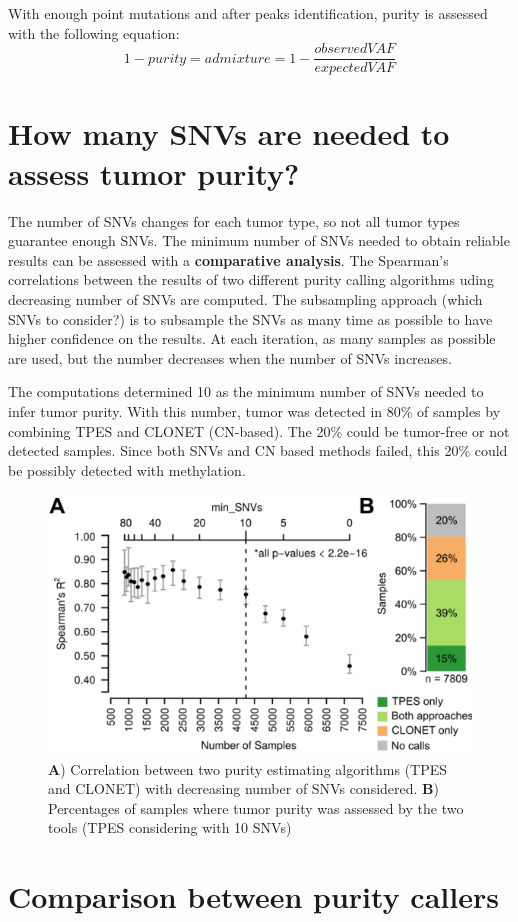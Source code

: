 With enough point mutations and after peaks identification, purity is assessed
with the following equation:
\[ 1-purity = admixture = 1-\frac{observedVAF}{expectedVAF} \]

\section{How many SNVs are needed to assess tumor purity?}

The number of SNVs changes for each tumor type, so not all tumor types guarantee
enough SNVs. The minimum number of SNVs needed to obtain reliable results can be
assessed with a \textbf{comparative analysis}. The Spearman's correlations
between the results of two different purity calling algorithms uding decreasing
number of SNVs are computed. The subsampling approach (which SNVs to consider?)
is to subsample the SNVs as many time as possible to have higher confidence on
the results. At each iteration, as many samples as possible are used, but the
number decreases when the number of SNVs increases.

The computations determined 10 as the minimum number of SNVs needed to infer
tumor purity. With this number, tumor was detected in 80\% of samples by
combining TPES and CLONET (CN-based). The 20\% could be tumor-free or not
detected samples. Since both SNVs and CN based methods failed, this 20\% could
be possibly detected with methylation.

\begin{figure}[!ht]
\centering
    \includegraphics[width=0.7\linewidth]{comparative.png}
    \caption{\label{fig:comp}\textbf{A}) Correlation between two purity
    estimating algorithms (TPES and CLONET) with decreasing number of SNVs
    considered. \textbf{B}) Percentages of samples where tumor purity was
    assessed by the two tools (TPES considering with 10 SNVs)}
\end{figure}


\section{Comparison between purity callers}

